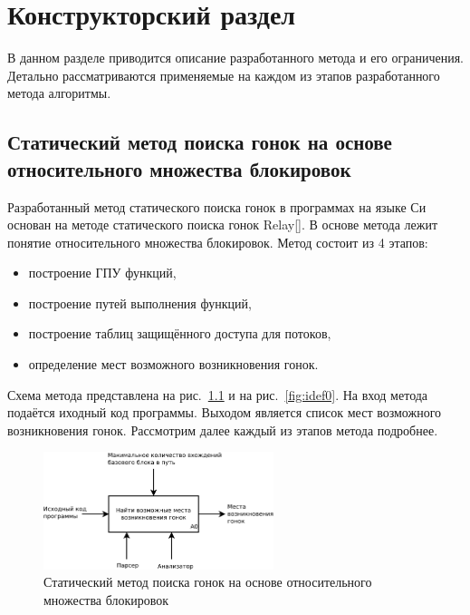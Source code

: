 \chapter{Конструкторский раздел}
\label{cha:design}

В данном разделе приводится описание разработанного метода и его ограничения. Детально рассматриваются применяемые на каждом из этапов разработанного метода алгоритмы.

\section{Статический метод поиска гонок на основе относительного множества блокировок}

Разработанный метод статического поиска гонок в программах на языке Си основан на методе статического поиска гонок Relay[]. В основе метода лежит понятие относительного множества блокировок. Метод состоит из 4 этапов:

\begin{itemize}
  \item построение ГПУ функций,
  \item построение путей выполнения  функций,
  \item построение таблиц защищённого доступа для потоков,
  \item определение мест возможного возникновения гонок.
\end{itemize}

Схема метода представлена на рис.~\ref{fig:idef0-black-box} и на рис.~\ref{fig:idef0}. На вход метода подаётся иходный код программы. Выходом является список мест возможного возникновения гонок. Рассмотрим далее каждый из этапов метода подробнее.

\begin{figure}
  \centering
  \includegraphics[width=0.6\textwidth]{inc/dia/idef0-black-box}
  \caption{Статический метод поиска гонок на основе относительного множества блокировок}
  \label{fig:idef0-black-box}
\end{figure}

